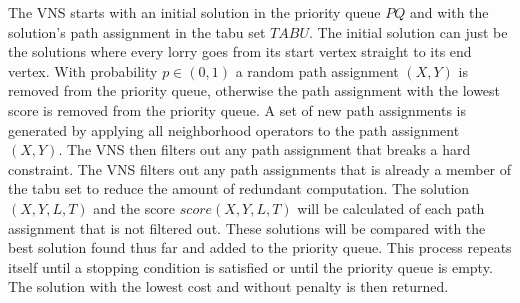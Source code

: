 The VNS starts with  an initial solution in the priority queue $PQ$ and with the solution's path assignment in the tabu set $TABU$.
%
The initial solution can just be the solutions where every lorry goes from its start vertex straight to its end vertex.
%
%
With probability $p \in (0,1)$ a random path assignment $(X,Y)$ is removed from the priority queue, otherwise the path assignment with the lowest score is removed from the priority queue.
A set of new path assignments
is generated by applying all neighborhood operators to the path assignment $(X,Y)$.
The VNS then filters out any path assignment that breaks a hard constraint.
The VNS filters out any path assignments that is already a member of the tabu set to reduce the amount of redundant computation.
%
The solution $(X,Y,L,T)$ and the score $score(X,Y,L,T)$ will be calculated of each path assignment that is not filtered out.
These solutions will be compared with the best solution found thus far and added to the priority queue.
%
This process repeats itself until a stopping condition is satisfied or until the priority queue is empty.
The solution with the lowest cost and without penalty is then returned.



%


